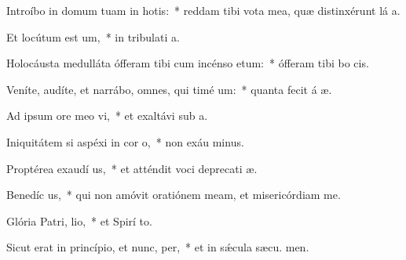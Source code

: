 \item Introíbo in domum tuam in hotis:~* reddam tibi vota mea, quæ distinxérunt lá a.
\item Et locútum est  um,~* in tribulati a.
\item Holocáusta medulláta ófferam tibi cum incénso etum:~* ófferam tibi bo  cis.
\item Veníte, audíte, et narrábo, omnes, qui timé um:~* quanta fecit á æ.
\item Ad ipsum ore meo vi,~* et exaltávi sub  a.
\item Iniquitátem si aspéxi in cor o,~* non exáu minus.
\item Proptérea exaudí us,~* et atténdit voci deprecati æ.
\item Benedíc us,~* qui non amóvit oratiónem meam, et misericórdiam   me.
\item Glória Patri,  lio,~* et Spirí to.
\item Sicut erat in princípio, et nunc,  per,~* et in sǽcula sæcu. men.
